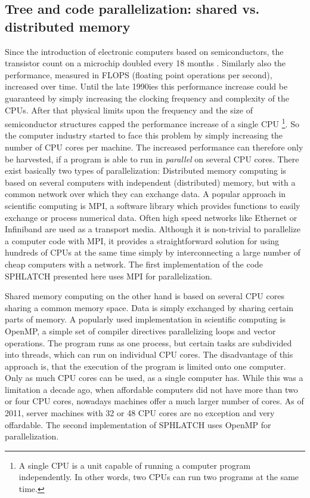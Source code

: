 \subsection{Tree and code parallelization: shared vs. distributed memory}
Since the introduction of electronic computers based on semiconductors, the transistor count on a microchip doubled every 18 months \citep{Moore:1965p4006}. Similarly also the performance, measured in FLOPS (floating point operations per second), increased over time. Until the late 1990ies this performance increase could be guaranteed by simply increasing the clocking frequency and complexity of the CPUs. After that physical limits upon the frequency and the size of semiconductor structures capped the performance increase of a single CPU \footnote{A single CPU is a unit capable of running a computer program independently. In other words, two CPUs can run two programs at the same time.}. So the computer industry started to face this problem by simply increasing the number of CPU cores per machine. The increased performance can therefore only be harvested, if a program is able to run in \emph{parallel} on several CPU cores. There exist basically two types of parallelization: 
Distributed memory computing is based on several computers with independent (distributed) memory, but with a common network over which they can exchange data. A popular approach in scientific computing is MPI, a software library which provides functions to easily exchange or process numerical data. Often high speed networks like Ethernet or Infiniband are used as a transport media. Although it is non-trivial to parallelize a computer code with MPI, it provides a straightforward solution for using hundreds of CPUs at the same time simply by interconnecting a large number of cheap computers with a network. The first implementation of the code SPHLATCH presented here uses MPI for parallelization. 

Shared memory computing on the other hand is based on several CPU cores sharing a common memory space. Data is simply exchanged by sharing certain parts of memory. A popularly used implementation in scientific computing is OpenMP, a simple set of compiler directives parallelizing loops and vector operations. The program runs as one process, but certain tasks are subdivided into threads, which can run on individual CPU cores. The disadvantage of this approach is, that the execution of the program is limited onto one computer. Only as much CPU cores can be used, as a single computer has. While this was a limitation a decade ago, when affordable computers did not have more than two or four CPU cores, nowadays machines offer a much larger number of cores. As of 2011, server machines with 32 or 48 CPU cores are no exception and very offardable. The second implementation of SPHLATCH uses OpenMP for parallelization.

